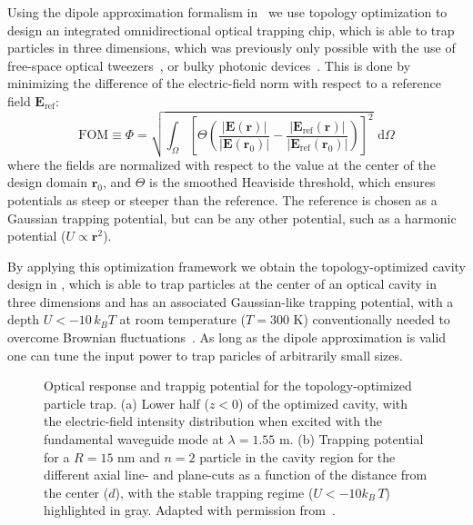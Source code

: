 Using the dipole approximation formalism in~\cite{ownpub1} we use topology optimization to design an integrated omnidirectional optical trapping chip, which is able to trap particles in three dimensions,
which was previously only possible with the use of free-space optical tweezers~\cite{ashkin_acceleration_1970}, or bulky photonic devices~\cite{manka_simulation_2024}. This is done by minimizing 
the difference of the electric-field norm with respect to a reference field $\mathbf{E}_\text{ref}$:
\begin{equation}
    \text{FOM} \equiv \Phi=\sqrt{\int_{\Omega}\left[\Theta\left(\frac{|\mathbf{E}(\mathbf{r})|}{\left|\mathbf{E}\left(\mathbf{r}_0\right)\right|}-\frac{\left|\mathbf{E}_{\text{ref}}(\mathbf{r})\right|}{\left|\mathbf{E}_{\text{ref}}\left(\mathbf{r}_0\right)\right|}\right)\right]^2} \text{~d} \Omega
    \end{equation}
where the fields are normalized with respect to the value at the center of the design domain $\mathbf{r}_0$, and $\Theta$ is the smoothed Heaviside threshold, which ensures
potentials as steep or steeper than the reference. The reference is chosen as a Gaussian trapping potential, but can be any other potential, such as a harmonic potential ($U\propto\mathbf{r}^2$).

By applying this optimization framework we obtain the topology-optimized cavity design in , which is able to trap particles at the center of an optical
cavity in three dimensions and has an associated Gaussian-like trapping potential, with a depth  $U<-10\, k_B T$ at room temperature ($T=300$ K) conventionally needed to overcome Brownian fluctuations~\cite{novotny}.
As long as the dipole approximation is valid one can tune the input power to trap paricles of arbitrarily small sizes.

\begin{figure}[tb]
    \centering
    \caption{Optical response and trappig potential for the topology-optimized particle trap. (a) Lower half ($z<0$) of the optimized cavity, with the electric-field intensity
    distribution when excited with the fundamental waveguide mode at $\lambda=1.55$ \textmu m. (b) Trapping potential for a $R=15$ nm and $n=2$ particle in the cavity region for the different axial line- and plane-cuts as a function
    of the distance from the center ($d$), with the stable trapping regime ($U<-10 k_B\, T$) highlighted in gray. Adapted with permission from~\cite{ownpub1}.}
    \label{fig:MST_dipole}
\end{figure}

